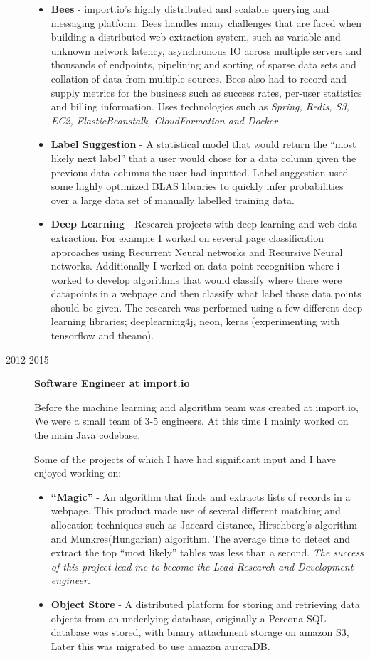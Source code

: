 \documentclass[a4paper]{article}
\def\tightlist{}
\begin{document}
\begin{description}
\begin{itemize}
\tightlist
\item
  \textbf{Bees} - import.io's highly distributed and scalable querying
  and messaging platform. Bees handles many challenges that are faced
  when building a distributed web extraction system, such as variable
  and unknown network latency, asynchronous IO across multiple servers
  and thousands of endpoints, pipelining and sorting of sparse data sets
  and collation of data from multiple sources. Bees also had to record
  and supply metrics for the business such as success rates, per-user
  statistics and billing information. Uses technologies such as
  \emph{Spring, Redis, S3, EC2, ElasticBeanstalk, CloudFormation and
  Docker}
\item
  \textbf{Label Suggestion} - A statistical model that would return the
  ``most likely next label'' that a user would chose for a data column
  given the previous data columns the user had inputted. Label
  suggestion used some highly optimized BLAS libraries to quickly infer
  probabilities over a large data set of manually labelled training
  data.
\item
  \textbf{Deep Learning} - Research projects with deep learning and web
  data extraction. For example I worked on several page classification
  approaches using Recurrent Neural networks and Recursive Neural
  networks. Additionally I worked on data point recognition where i
  worked to develop algorithms that would classify where there were
  datapoints in a webpage and then classify what label those data points
  should be given. The research was performed using a few different deep
  learning libraries; deeplearning4j, neon, keras (experimenting with
  tensorflow and theano).
\end{itemize}
\item[2012-2015]
\textbf{Software Engineer at import.io}

Before the machine learning and algorithm team was created at import.io,
We were a small team of 3-5 engineers. At this time I mainly worked on
the main Java codebase.

Some of the projects of which I have had significant input and I have
enjoyed working on:

\begin{itemize}
\tightlist
\item
  \textbf{``Magic''} - An algorithm that finds and extracts lists of
  records in a webpage. This product made use of several different
  matching and allocation techniques such as Jaccard distance,
  Hirschberg's algorithm and Munkres(Hungarian) algorithm. The average
  time to detect and extract the top ``most likely'' tables was less
  than a second. \emph{The success of this project lead me to become the
  Lead Research and Development engineer.}
\item
  \textbf{Object Store} - A distributed platform for storing and
  retrieving data objects from an underlying database, originally a
  Percona SQL database was stored, with binary attachment storage on
  amazon S3, Later this was migrated to use amazon auroraDB.
\end{itemize}
\end{description}
\end{document}
